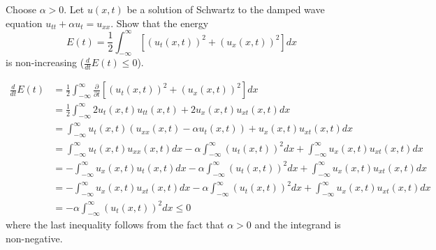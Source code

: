 \documentclass[plain]{pset}
\begin{document}
\pagebreak

\begin{problem}
Choose \(\alpha > 0\). Let \(u(x, t)\) be a solution of Schwartz to the damped wave equation \(u_{tt} + \alpha u_t = u_{xx}\). Show that the energy
\[E(t) = \frac{1}{2}\int_{-\infty}^{\infty} \left[{\left(u_t(x, t)\right)}^2 + {\left(u_x(x, t)\right)}^2\right]dx\]
is non-increasing (\(\frac{d}{dt}E(t) \leq 0\)).
\end{problem}
\begin{solution}
    \begin{align*}
        \frac{d}{dt}E(t) & = \frac{1}{2}\int_{-\infty}^{\infty} \frac{\partial }{\partial t}\left[{\left(u_t(x, t)\right)}^2 + {\left(u_x(x, t)\right)}^2\right]dx                            \\
                         & = \frac{1}{2}\int_{-\infty}^{\infty} 2u_t(x, t)u_{tt}(x, t) + 2u_x(x, t)u_{xt}(x, t)dx                                                                             \\
                         & = \int_{-\infty}^{\infty} u_t(x, t)(u_{xx}(x, t) - \alpha u_t(x, t)) + u_x(x, t)u_{xt}(x, t)dx                                                                     \\
                         & = \int_{-\infty}^{\infty} u_t(x, t)u_{xx}(x, t) dx - \alpha \int_{-\infty}^{\infty} {\left(u_t(x, t)\right)}^2dx + \int_{-\infty}^{\infty} u_x(x, t)u_{xt}(x, t)dx \\
                         & = -\int_{-\infty}^{\infty} u_x(x, t)u_t(x, t)dx - \alpha \int_{-\infty}^{\infty} {\left(u_t(x, t)\right)}^2dx + \int_{-\infty}^{\infty} u_x(x, t)u_{xt}(x, t)dx    \\
                         & = -\int_{-\infty}^{\infty} u_x(x, t)u_{xt}(x, t)dx - \alpha \int_{-\infty}^{\infty} {\left(u_t(x, t)\right)}^2dx + \int_{-\infty}^{\infty} u_x(x, t)u_{xt}(x, t)dx \\
                         & = -\alpha \int_{-\infty}^{\infty} {\left(u_t(x, t)\right)}^2dx \leq 0
    \end{align*}
    where the last inequality follows from the fact that \(\alpha > 0\) and the integrand is non-negative.
\end{solution}
\end{document}
